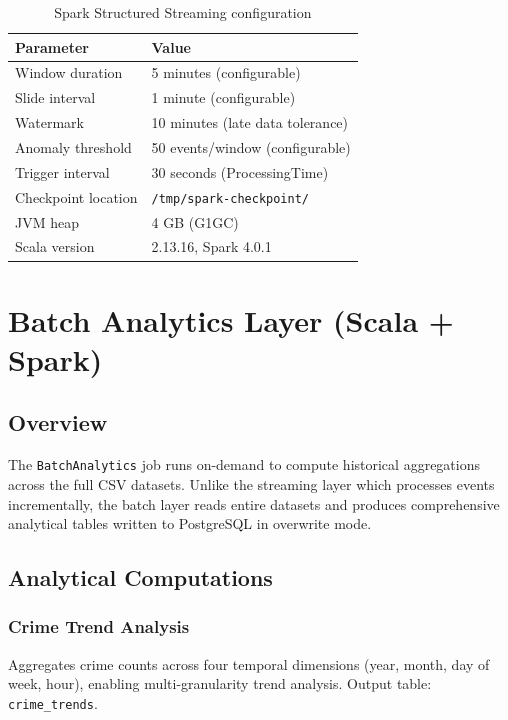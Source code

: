 \documentclass[12pt,a4paper]{article}
\begin{document}
\begin{table}[H]
\centering
\caption{Spark Structured Streaming configuration}
\begin{tabular}{l l}
\toprule
\textbf{Parameter} & \textbf{Value} \\
\midrule
Window duration & 5 minutes (configurable) \\
Slide interval & 1 minute (configurable) \\
Watermark & 10 minutes (late data tolerance) \\
Anomaly threshold & 50 events/window (configurable) \\
Trigger interval & 30 seconds (ProcessingTime) \\
Checkpoint location & \texttt{/tmp/spark-checkpoint/} \\
JVM heap & 4 GB (G1GC) \\
Scala version & 2.13.16, Spark 4.0.1 \\
\bottomrule
\end{tabular}
\end{table}

\section{Batch Analytics Layer (Scala + Spark)}

\subsection{Overview}

The \texttt{BatchAnalytics} job runs on-demand to compute historical aggregations across the full CSV datasets. Unlike the streaming layer which processes events incrementally, the batch layer reads entire datasets and produces comprehensive analytical tables written to PostgreSQL in overwrite mode.

\subsection{Analytical Computations}

\subsubsection{Crime Trend Analysis}

Aggregates crime counts across four temporal dimensions (year, month, day of week, hour), enabling multi-granularity trend analysis. Output table: \texttt{crime\_trends}.
\end{document}
